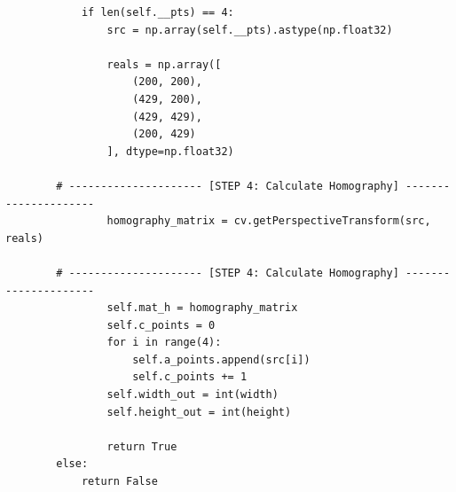 \documentclass[a4paper, 12pt]{article}
\begin{document}
\begin{lstlisting}
            if len(self.__pts) == 4:
                src = np.array(self.__pts).astype(np.float32)

                reals = np.array([
                    (200, 200),
                    (429, 200),
                    (429, 429),
                    (200, 429)
                ], dtype=np.float32)

        # --------------------- [STEP 4: Calculate Homography] ---------------------
                homography_matrix = cv.getPerspectiveTransform(src, reals)

        # --------------------- [STEP 4: Calculate Homography] ---------------------
                self.mat_h = homography_matrix
                self.c_points = 0
                for i in range(4):
                    self.a_points.append(src[i])
                    self.c_points += 1
                self.width_out = int(width)
                self.height_out = int(height)

                return True
        else:
            return False

	\end{lstlisting}
\end{document}
